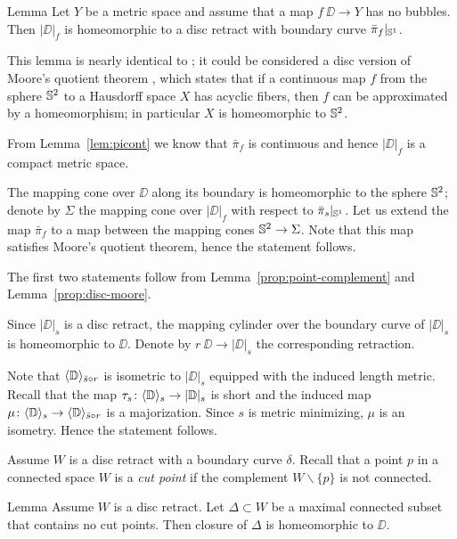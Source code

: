 \begin{thm}{Lemma}\label{prop:disc-moore}
Let $Y$ be a metric space and assume that a map $f\:\DD\to Y$ has no bubbles.
Then $|\DD|_f$ is homeomorphic to a disc retract with boundary curve $\bar\pi_f|_{\mathbb{S}^1}$.
\end{thm}

This lemma is nearly identical to \cite[Corollary 7.12]{LW3}; it could be considered a disc version of Moore's quotient theorem \cite{moore}, \cite{daverman}
which states that if a continuous map $f$ from the sphere $\mathbb{S}^2$ to a Hausdorff space $X$
has acyclic fibers, then $f$ can be approximated by a homeomorphism;
in particular $X$ is homeomorphic to $\mathbb{S}^2$.

From Lemma~\ref{lem:picont} we know that $\bar\pi_f$ is continuous and hence $|\DD|_f$
is a compact metric space. 


The mapping cone over $\DD$ along its boundary is homeomorphic to the sphere $\mathbb{S}^2$;
denote by $\Sigma$ the mapping cone over $|\DD|_f$ with respect to $\bar\pi_s|_{\mathbb{S}^1}$.
Let us extend the map $\bar\pi_f$ to a map between the mapping cones $\mathbb{S}^2\to\Sigma$.
Note that this map satisfies Moore's quotient theorem, hence the statement follows.
\qeds

The first two statements follow from Lemma~\ref{prop:point-complement} and Lemma~\ref{prop:disc-moore}.

Since $|\DD|_s$ is a disc retract, the mapping cylinder over the boundary curve of $|\DD|_s$ is homeomorphic to $\DD$.
Denote by $r \:\DD\to |\DD|_s$ the corresponding retraction.

Note that $\langle\mathbb{D}\rangle_{\bar s\circ r}$ is isometric to $|\DD|_s$ equipped with the induced length metric.
Recall that the map $\tau_s\colon\langle\mathbb{D}\rangle_s\to|\mathbb{D}|_s$ is short and the induced map $\mu\:\<\DD\>_s\zz\to\<\DD\>_{\bar s\circ r}$ is a majorization.
Since $s$ is metric minimizing, $\mu$ is an isometry.
Hence the statement follows.
\qeds

Assume $W$ is a disc retract with a boundary curve $\delta$.
Recall that a point $p$ in a connected space $W$ is a \emph{cut point} if the complement $W\backslash\{p\}$ is not connected.

\begin{thm}{Lemma}\label{lem:discs}
Assume $W$ is a disc retract.
Let $\Delta\subset W$ be a maximal connected subset that contains no cut points.
Then closure of $\Delta$ is homeomorphic to $\DD$.
\end{thm}

